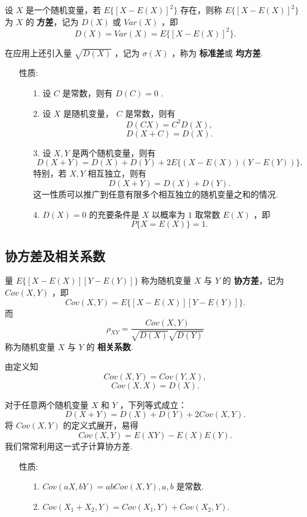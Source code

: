 \documentclass[UTF8,10pt]{ctexart}
\begin{document}
	设 $ X $ 是一个随机变量，若 $ E\{[X-E(X)]^{2}\} $ 存在，则称 $ E\{[X-E(X)]^{2}\} $ 为 $ X $ 的 \textbf{方差}，记为 $ D(X) $ 或 $ Var(X) $ ，即 $$ D(X)=Var(X)=E\{[X-E(X)]^{2}\}. $$
	
	在应用上还引入量 $ \sqrt{D(X)} $ ，记为 $ \sigma(X) $ ，称为 \textbf{标准差}或 \textbf{均方差}.
	
	\begin{itemize}
		\item [性质:] {
			\begin{enumerate}
				\item [1.] 设 $ C $ 是常数，则有 $ D(C)=0 $ .
				\item [2.] 设 $ X $ 是随机变量， $ C $ 是常数，则有 $$ D(CX)=C^{2}D(X), $$ $$ D(X+C)=D(X). $$
				\item [3.] 设 $ X,Y $ 是两个随机变量，则有 $$ D(X+Y)=D(X)+D(Y)+2E\{(X-E(X))(Y-E(Y))\}. $$ 特别，若 $ X,Y $ 相互独立，则有 $$ D(X+Y)=D(X)+D(Y). $$ 这一性质可以推广到任意有限多个相互独立的随机变量之和的情况.
				\item [4.] $ D(X)=0 $ 的充要条件是 $ X $ 以概率为 $ 1 $ 取常数 $ E(X) $ ，即 $$ P\{X=E(X)\}=1. $$
			\end{enumerate}
		}
	\end{itemize}
	
	\subsection{协方差及相关系数}
	
	量 $ E\{[X-E(X)][Y-E(Y)]\} $ 称为随机变量 $ X $ 与 $ Y $ 的 \textbf{协方差}，记为 $ Cov(X,Y) $ ，即 $$ Cov(X,Y)=E\{[X-E(X)][Y-E(Y)]\}. $$ 而 $$ \rho _{XY}= \frac{Cov(X,Y)}{ \sqrt{D(X)} \sqrt{D(Y)} } $$ 称为随机变量 $ X $ 与 $ Y $ 的 \textbf{相关系数}.
	
	由定义知 $$ Cov(X,Y)=Cov(Y,X), $$ $$ Cov(X,X)=D(X). $$
	
	对于任意两个随机变量 $ X $ 和 $ Y $ ，下列等式成立： $$ D(X+Y)=D(X)+D(Y)+2Cov(X,Y). $$ 将 $ Cov(X,Y) $ 的定义式展开，易得 $$ Cov(X,Y)=E(XY)-E(X)E(Y). $$ 我们常常利用这一式子计算协方差.
	
	\begin{itemize}
		\item [性质:] {
			\begin{enumerate}
				\item [1.] $ Cov(aX,bY)=abCov(X,Y),a,b $ 是常数.
				\item [2.] $ Cov(X_{1}+X_{2},Y)=Cov(X_{1},Y)+Cov(X_{2},Y). $
			\end{enumerate}
		}
	\end{itemize}
\end{document}
